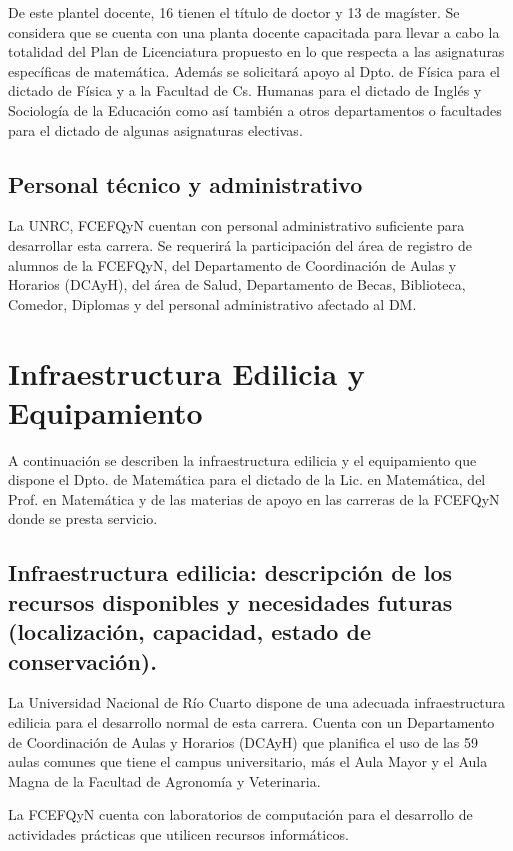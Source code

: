 \documentclass[a4paper, 12pt]{article}
\begin{document}
De este plantel docente,  16 tienen  el título de doctor y 13 de magíster. Se considera que se cuenta con una planta docente
capacitada para llevar a cabo la totalidad del Plan de
Licenciatura propuesto en lo que  respecta a las
asignaturas específicas de matemática. Además se solicitará apoyo
al Dpto. de Física para el dictado de Física y a la Facultad de
Cs. Humanas para el dictado de Inglés y Sociología de la Educación como así también a otros departamentos o facultades para el
dictado de algunas asignaturas electivas. 

\subsection{Personal técnico y administrativo}

La UNRC, FCEFQyN cuentan con personal
administrativo suficiente para desarrollar esta carrera. Se requerirá la participación del área de registro de alumnos de la FCEFQyN, del Departamento de Coordinación de Aulas y Horarios (DCAyH), del área de Salud, Departamento de Becas, Biblioteca, Comedor, Diplomas y del personal administrativo afectado al DM.  



\section{Infraestructura Edilicia y Equipamiento}


A continuación se describen la infraestructura edilicia y el equipamiento  que dispone el Dpto. de Matemática para el dictado de la  Lic. en Matemática,  del Prof. en Matemática y de las materias de apoyo en las carreras de la FCEFQyN donde se presta servicio.   

\subsection{Infraestructura edilicia: descripción de los recursos disponibles y necesidades futuras (localización, capacidad, estado de conservación).} 

La Universidad Nacional de Río Cuarto dispone de una adecuada infraestructura edilicia  para el desarrollo normal de esta carrera. Cuenta con un Departamento de Coordinación de Aulas y Horarios (DCAyH) que planifica el uso de las 59 aulas comunes que tiene el campus universitario, más el Aula Mayor y el Aula Magna de la Facultad de Agronomía y Veterinaria.

La FCEFQyN  cuenta con laboratorios de computación para el desarrollo de actividades prácticas que utilicen recursos informáticos. 
\end{document}
